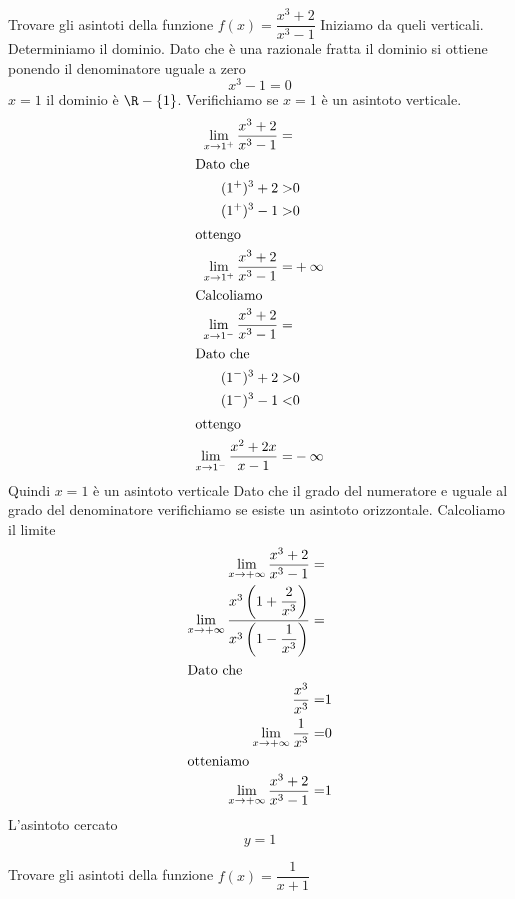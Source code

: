 \begin{exercise}
	Trovare gli asintoti della funzione $f(x)=\dfrac{x^3+2}{x^3-1}$
	\tcblower
	Iniziamo da queli verticali. Determiniamo il dominio. Dato che è una razionale fratta il dominio si ottiene ponendo il denominatore uguale a zero\[x^3-1=0\] $x=1$ il dominio è $\R-\lbrace1\rbrace$. Verifichiamo se $x=1$ è un asintoto verticale.
	\begin{align*}
	\lim_{x\to 1^+}\dfrac{x^3+2}{x^3-1}=&\\
	\intertext{Dato che}
	(1^+)^3+2>&0\\
	(1^+)^3-1>&0\\
	\intertext{ottengo}
	\lim_{x\to 1^+}\dfrac{x^3+2}{x^3-1}=&+\infty\\
		\intertext{Calcoliamo}
	\lim_{x\to 1^-}\dfrac{x^3+2}{x^3-1}=&\\
		\intertext{Dato che}
	(1^-)^3+2>&0\\
	(1^-)^3-1<&0\\
	\intertext{ottengo}
	\lim_{x\to 1^-}\dfrac{x^2+2x}{x-1}=&-\infty\\
	\end{align*}
	Quindi $x=1$ è un asintoto verticale
	Dato che il grado del numeratore e uguale al grado del denominatore verifichiamo se esiste un asintoto orizzontale. Calcoliamo il limite
	\begin{align*}
	\lim_{x\to +\infty}\dfrac{x^3+2}{x^3-1}=&\\
	\lim_{x\to +\infty}\dfrac{x^3\left(1+\dfrac{2}{x^3}\right)}{x^3\left(1-\dfrac{1}{x^3}\right)}=&\\
	\intertext{Dato che}
	\dfrac{x^3}{x^3}=&1\\
	\lim_{x\to +\infty}\dfrac{1}{x^3}=&0\\
	\intertext{otteniamo}
	\lim_{x\to +\infty}\dfrac{x^3+2}{x^3-1}=&1\\
	\end{align*}
	L'asintoto cercato\[y=1\]
\end{exercise}
\begin{exercise}[no solution]
	Trovare gli asintoti della funzione
	$f(x)=\dfrac{1}{x+1}$
\end{exercise}
